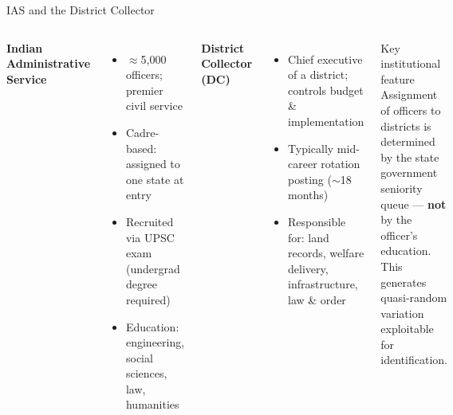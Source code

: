 \documentclass[aspectratio=169,10pt]{beamer}
\begin{document}
\begin{frame}{IAS and the District Collector}
  \begin{columns}[T]
    \textbf{Indian Administrative Service}
    \begin{itemize}\setlength\itemsep{4pt}
      \item $\approx$5{,}000 officers; premier civil service
      \item Cadre-based: assigned to one state at entry
      \item Recruited via UPSC exam (undergrad degree required)
      \item Education: engineering, social sciences, law, humanities
    \end{itemize}
    \vspace{8pt}
    \textbf{District Collector (DC)}
    \begin{itemize}\setlength\itemsep{4pt}
      \item Chief executive of a district; controls budget \& implementation
      \item Typically mid-career rotation posting ($\sim$18 months)
      \item Responsible for: land records, welfare delivery,
            infrastructure, law \& order
    \end{itemize}
    \begin{block}{Key institutional feature}
      Assignment of officers to districts is determined by the state
      government seniority queue — \textbf{not} by the officer's education.
      This generates quasi-random variation exploitable for identification.
    \end{block}
  \end{columns}
\end{frame}
\end{document}
